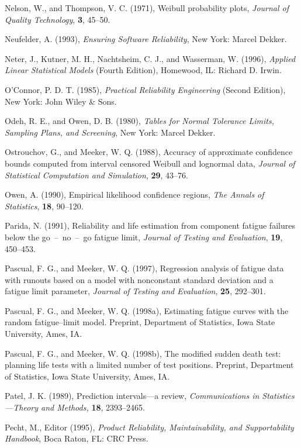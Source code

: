 \begin{thebibliography}{999}
Nelson, W., and Thompson, V. C. (1971), Weibull probability plots, {\em
Journal of Quality Technology}, {\bf 3}, 45--50.

Neufelder, A. (1993), {\em Ensuring Software Reliability}, New York:
Marcel Dekker.

Neter, J., Kutner, M. H., Nachtsheim, C. J., and Wasserman, W. (1996),
{\em Applied Linear Statistical Models} (Fourth Edition), Homewood,
IL: Richard D.  Irwin.

O'Connor, P. D. T. (1985), {\em Practical Reliability Engineering}
(Second Edition), New York: John Wiley \& Sons.

Odeh, R. E., and Owen, D. B. (1980), {\em Tables for Normal Tolerance
Limits, Sampling Plans, and Screening}, New York: Marcel Dekker.

Ostrouchov, G., and Meeker, W. Q. (1988), Accuracy of approximate
confidence bounds computed from interval censored Weibull and
lognormal data, {\em Journal of Statistical Computation and
Simulation}, {\bf 29}, 43--76.

Owen, A. (1990), Empirical likelihood confidence regions, {\em The
Annals of Statistics}, {\bf 18}, 90--120.

Parida, N. (1991), Reliability and life estimation from component
fatigue failures below the go~--~no~--~go fatigue limit, {\em Journal of
Testing and Evaluation}, {\bf 19}, 450--453.

Pascual, F. G., and Meeker, W. Q. (1997), Regression analysis of
fatigue data with runouts based on a model with nonconstant
standard deviation and a fatigue limit parameter,
{\em Journal of Testing and Evaluation}, {\bf 25}, 292--301.

Pascual, F. G., and Meeker, W. Q. (1998a), Estimating fatigue curves
with the random fatigue--limit model.  Preprint, Department of
Statistics, Iowa State University, Ames, IA.

Pascual, F. G., and Meeker, W. Q. (1998b), The modified sudden death
test: planning life tests with a limited number of test
positions. Preprint, Department of Statistics, Iowa State
University, Ames, IA.

Patel, J. K. (1989), Prediction intervals---a review, {\em
Communications in Statistics---Theory and Methods, } {\bf 18},
2393--2465.

Pecht, M., Editor (1995), {\em Product Reliability, Maintainability,
and Supportability Handbook}, Boca Raton, FL: CRC Press.


\end{thebibliography}
